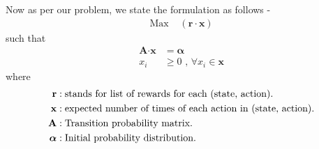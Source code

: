\documentclass[11pt]{article}
\begin{document}
Now as per our problem, we state the formulation as follows - 
	\begin{align*}
		\text{Max } & (\textbf{r} \cdot \textbf{x})
	\end{align*}
	such that 
	\begin{align*}
		\textbf{A} \cdot \textbf{x} &= \boldsymbol{\alpha} \\
		x_i &\geq 0 \text{ ,  } \forall \text{}  x_i \in \textbf{x}
	\end{align*}
	where 
	\begin{align*}
		\text{\textbf{r}} & : \text{stands for list of rewards for each (state, action).}\\		
		\text{\textbf{x}} & : \text{expected number of times of each action in (state, action).}\\		
		\text{\textbf{A}} & : \text{Transition probability matrix.}\\		
		\boldsymbol{\alpha} & : \text{Initial probability distribution.}	
	\end{align*}
\end{document}
